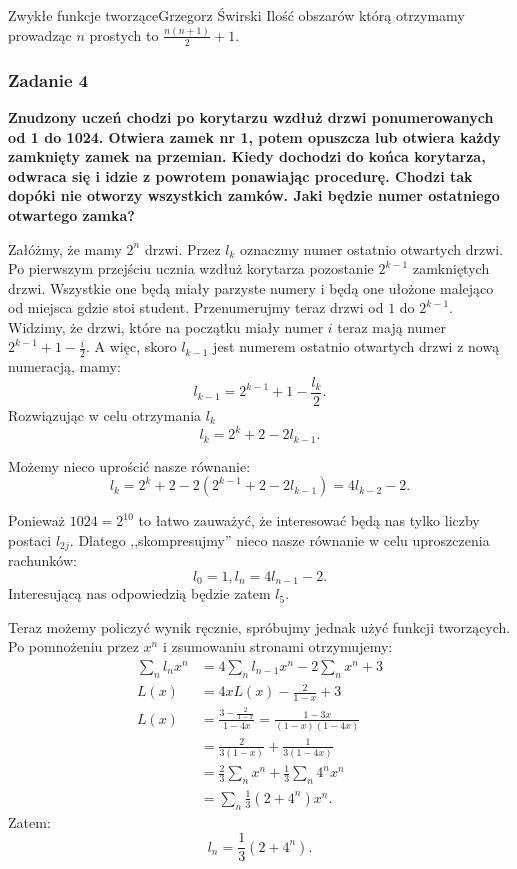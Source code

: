 \begin{referat}{Zwykłe funkcje tworzące}{Grzegorz Świrski}
Ilość obszarów którą otrzymamy prowadząc $n$ prostych to $\frac{n(n+1)}{2} + 1$.

\subsubsection{Zadanie 4}
\textbf{Znudzony uczeń chodzi po korytarzu wzdłuż drzwi ponumerowanych od 1 do 1024.
Otwiera zamek nr 1, potem opuszcza lub otwiera każdy zamknięty zamek na przemian.
Kiedy dochodzi do końca korytarza, odwraca się i idzie z powrotem ponawiając
procedurę. Chodzi tak dopóki nie otworzy wszystkich zamków. Jaki będzie numer
ostatniego otwartego zamka?}

Załóżmy, że mamy $2^n$ drzwi. Przez $l_k$ oznaczmy
numer ostatnio otwartych drzwi. Po pierwszym przejściu ucznia wzdłuż korytarza
pozostanie $2^{k-1}$ zamkniętych drzwi. Wszystkie one będą miały parzyste
numery i będą one ułożone malejąco od miejsca gdzie stoi student. Przenumerujmy
teraz drzwi od $1$ do $2^{k-1}$. Widzimy, że drzwi, które na początku miały numer
$i$ teraz mają numer $2^{k-1} + 1 - \frac{i}{2}$. A więc, skoro $l_{k-1}$ jest
numerem ostatnio otwartych drzwi z nową numeracją, mamy:
$$l_{k-1} = 2^{k-1} + 1 - \frac{l_k}{2}.$$
Rozwiązując w celu otrzymania $l_k$
$$ l_k = 2^k + 2 - 2l_{k-1}.$$

Możemy nieco uprościć nasze równanie:
$$l_k = 2^k + 2 - 2(2^{k-1} + 2 - 2l_{k-1}) = 4 l_{k-2} - 2.$$

Ponieważ $1024 = 2^{10}$ to łatwo zauważyć, że interesować będą nas
tylko liczby postaci $l_{2j}$. Dlatego ,,skompresujmy'' nieco nasze
równanie w celu uproszczenia rachunków:
$$l_0 = 1, l_n = 4l_{n-1} - 2.$$
Interesującą nas odpowiedzią będzie zatem $l_5$.

Teraz możemy policzyć wynik ręcznie, spróbujmy jednak użyć funkcji
tworzących. Po pomnożeniu przez $x^n$ i zsumowaniu stronami otrzymujemy:
\begin{align*}
  \sum_n l_n x^n &= 4 \sum_n l_{n-1}x^n - 2\sum_n x^n + 3 \\
  L(x) &= 4xL(x) - \frac{2}{1-x} + 3 \\
  L(x) &= \frac{3-\frac{2}{1-x}}{1-4x} = \frac{1-3x}{(1-x)(1-4x)} \\
       &= \frac{2}{3(1-x)} + \frac{1}{3(1-4x)} \\
       &= \frac{2}{3} \sum_n x^n + \frac{1}{3} \sum_n 4^n x^n \\
       &= \sum_n \frac{1}{3}(2 + 4^n)x^n.
\end{align*}
Zatem:
$$ l_n = \frac{1}{3}(2 + 4^n).$$


\end{referat}
